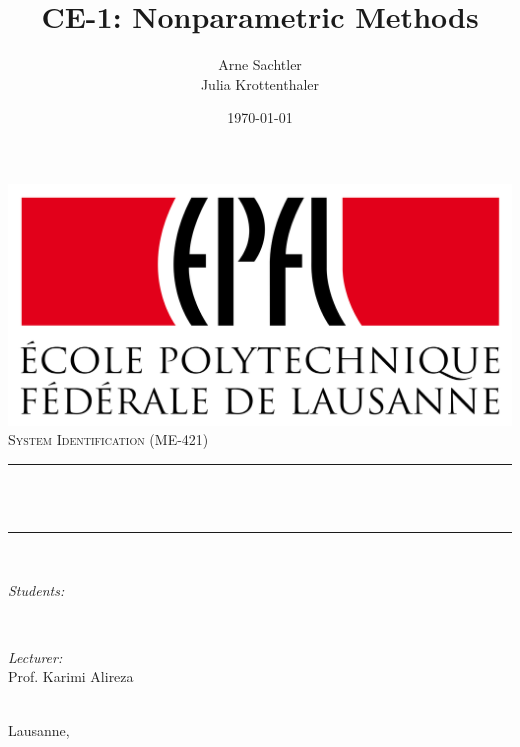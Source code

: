 \documentclass{scrartcl}
\begin{document}
\begin{titlepage}

\title{CE-1: Nonparametric Methods} %
\author{Arne Sachtler \\ Julia Krottenthaler}		%
\date{\today}								%

\makeatletter
\let\thetitle\@title
\let\theauthor\@author
\let\thedate\@date
\makeatother

\centering
\vspace*{0.5 cm}

    \includegraphics[width=0.7\linewidth]{figures/EPFL_Logo.png}\\[1.0 cm]	
	\textsc{\Large System Identification (ME-421)}\\[1.0cm]				
	\rule{\linewidth}{0.2 mm} \\[0.5 cm]
	{ \LARGE \thetitle}\\
	\rule{\linewidth}{0.2 mm} \\[1.5 cm]
	
    \vspace{1cm}
	\begin{minipage}{0.5\textwidth}
		\begin{flushleft} \large
			\emph{{Students}:}\\
			\theauthor
			\end{flushleft}
			\end{minipage}~
			\begin{minipage}{0.4\textwidth}
			\begin{flushright} \large
			\emph{{Lecturer}:} \\	
			Prof. Karimi Alireza  \\
		\end{flushright}
	\end{minipage}\\[1.2cm]
	{\vspace{3cm} \large Lausanne, \thedate}\\[1.5 cm]
	\vfill
\end{titlepage}

\end{document}
